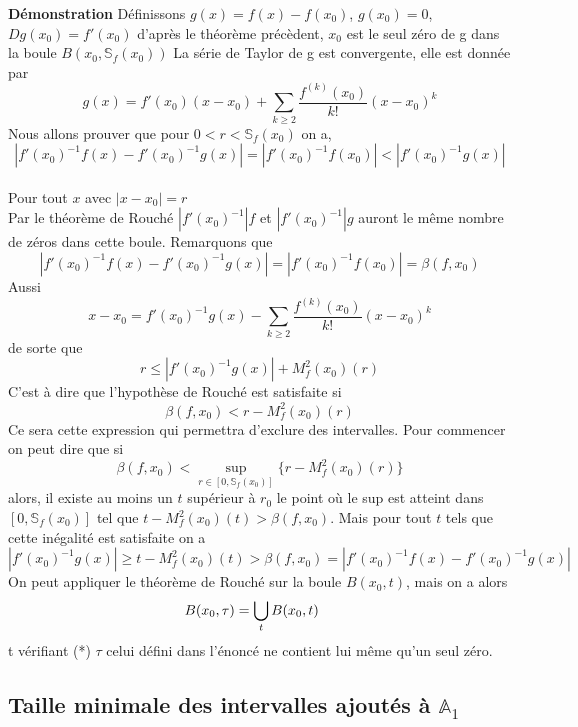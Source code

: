 \documentclass[a4paper,10.5pt]{article}
\begin{document}
	\noindent\textbf{Démonstration} Définissons $g(x)=f(x)-f(x_0)$, $g(x_0)=0$, $Dg(x_0)=f'(x_0)$ d'après le théorème précèdent, $x_0$ est le seul zéro de g dans la boule
	$B(x_0,\mathbb{S}_{f}(x_0))$
	La série de Taylor de g est convergente, elle est donnée par
	\[g(x)=f'(x_0)(x-x_0)+ \sum_{k \geq 2}\frac{f^{(k)}(x_0)}{k!}(x-x_0)^k\]
	Nous allons prouver que pour $0<r<\mathbb{S}_{f}(x_0)$ on a,
	\[|f'(x_0)^{-1}f(x)-f'(x_0)^{-1}g(x)|=|f'(x_0)^{-1}f(x_0)|<|f'(x_0)^{-1}g(x)|\]
	\\
	Pour tout $x$ avec $|x-x_0|=r$
	\\
	Par le théorème de Rouché $|f'(x_0)^{-1}|f$ et $|f'(x_0)^{-1}|g$ auront le même nombre de zéros dans cette boule. Remarquons que 
	\[|f'(x_0)^{-1}f(x)-f'(x_0)^{-1}g(x)|=|f'(x_0)^{-1}f(x_0)|=\beta(f,x_0)\]
	Aussi
	\[x-x_0=f'(x_0)^{-1}g(x)-\sum_{k \geq 2}\frac{f^{(k)}(x_0)}{k!}(x-x_0)^k\]
	de sorte que
	\[r \leq |f'(x_0)^{-1}g(x)|+M_{f}^{2}(x_0)(r) \]
	C'est à dire que l'hypothèse de Rouché est satisfaite si
	\[\beta(f,x_0)<r-M_{f}^{2}(x_0)(r)\] 
	Ce sera cette expression qui permettra d'exclure des intervalles. Pour commencer on peut dire que si 
	\[\beta(f,x_0)< \sup_{r \in [0,\mathbb{S}_{f}(x_0)]}\{r-M_{f}^{2}(x_0)(r)\}\]
	alors, il existe au moins un $t$ supérieur à $r_0$ le point où le sup est atteint dans $[0,\mathbb{S}_{f}(x_0)]$ tel que $t-M_{f}^{2}(x_0)(t)>\beta(f,x_0)$.
	Mais pour tout $t$ tels que cette inégalité est satisfaite on a
	\[|f'(x_0)^{-1}g(x)|\geq t-M_{f}^{2}(x_0)(t)>\beta(f,x_0)=|f'(x_0)^{-1}f(x)-f'(x_0)^{-1}g(x)| \tag{*}\]
	On peut appliquer le théorème de Rouché sur la boule $B(x_0,t)$, mais on a alors
 	\[B(x_0,\tau)=\bigcup_{t}B(x_0,t) \hspace{4mm} \]
	t vérifiant (*) $\tau$ celui défini dans l'énoncé ne contient lui même qu'un seul zéro.
	 
	
	
	\subsection{Taille minimale des intervalles ajoutés à $\mathbb{A}_1$}

	
\end{document}
